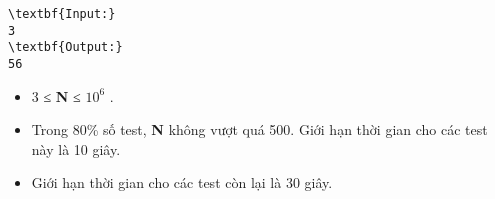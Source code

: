 \begin{verbatim}
\textbf{Input:}
3
\textbf{Output:}
56\end{verbatim}
\begin{itemize}
	\item 3 ≤ \textbf{ N } ≤ $10^{6}$ .
	\item Trong 80\% số test, \textbf{ N } không vượt quá 500. Giới hạn thời gian cho các test này là 10 giây.
	\item Giới hạn thời gian cho các test còn lại là 30 giây.
\end{itemize}